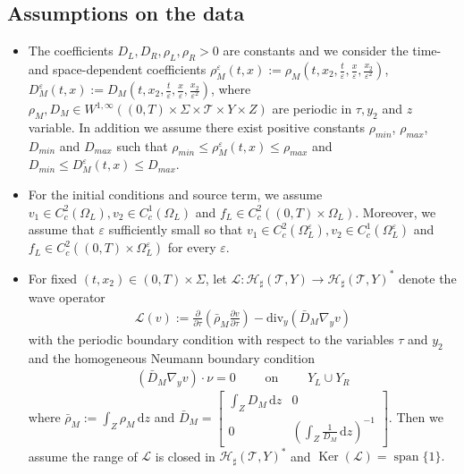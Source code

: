 \documentclass[11pt]{article}
\def\es{\varepsilon}
\def\oll{\Omega_L^\varepsilon}
\def\mol{\Omega_L}
\def\T{\mathcal{T}}
\newcommand{\di}[1]{\,\mathrm{d}#1}
\begin{document}
\subsection{Assumptions on the data}
\begin{itemize}
    \item [(A1)] The coefficients $D_L,D_R,\rho_L,\rho_R>0$ are constants and we consider the time- and space-dependent coefficients $\rho_M^\es(t,x):=\rho_M\left(t,x_2,\frac{t}{\es},\frac{x}{\es},\frac{x_2}{\es^2}\right)$, 
$D_M^\es(t,x):= D_M\left(t,x_2,\frac{t}{\es},\frac{x}{\es},\frac{x_2}{\es^2}\right)$, where $ \rho_M,D_M  \in W^{1,\infty}((0,T)\times \Sigma\times \T\times Y\times Z)$ are periodic in $\tau, y_2$ and $z$ variable. In addition we assume there exist positive constants $ \rho_{min}$, $\rho_{max}$, $D_{min}$ and $ D_{max}$ such that $\rho_{min}\leq\rho_M^\es(t,x)\leq\rho_{max}$ and  $D_{min}\leq D_M^\es(t,x)\leq D_{max}$.  


\item[(A2)] For the initial conditions and source term, we assume $v_1\in C_c^2(\mol), v_2\in C_c^1(\mol)$ and $f_L\in C_c^2((0,T)\times \mol)$.
 Moreover, we assume that $\es$ sufficiently small so that $v_1\in C_c^2(\oll), v_2\in C_c^1(\oll)$ and $f_L\in C_c^2((0,T)\times \oll)$ for every $\es$.
\item[(A3)] For fixed $(t,x_2)\in (0,T)\times \Sigma$,
%
let $\mathcal{L}:\mathcal{H}_{\sharp}(\T,Y)\rightarrow \mathcal{H}_{\sharp}(\T,Y)^*$ denote the  wave operator 
 \begin{align*}
         \mathcal{L}(v):= \frac{\partial}{\partial \tau}\left(\bar \rho_M \frac{\partial v}{\partial \tau}\right)-\mathrm{div}_y\left(\bar D_M\nabla_yv\right)
     \end{align*}
     with the periodic boundary condition with respect to the variables $\tau$ and $y_2$ and the homogeneous Neumann boundary condition
     \begin{align*}
         \left(\bar D_M\nabla_yv\right)\cdot \nu=0 \qquad\mbox{ on }\qquad Y_L\cup Y_R
     \end{align*}
     where $\bar \rho_M:=\int_Z\rho_M\di{z}$ and $\bar D_M=\begin{bmatrix}
            \int_Z D_M\di{z}&0\\
            0&  \left(\int_Z\frac{1}{ D_M}\di{z}\right)^{-1}\end{bmatrix}$. 
            Then we assume the range of $\mathcal{L}$ is closed in $\mathcal{H}_{\sharp}(\T,Y)^*$ and $\operatorname{Ker}(\mathcal{L})=\operatorname{span}\{1\}.$
            

\end{itemize}
\end{document}
